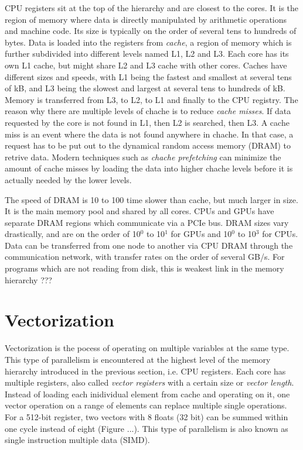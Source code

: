 CPU registers sit at the top of the hierarchy and are closest to the cores. It is the region of memory where data is directly manipulated by arithmetic operations and machine code. Its size is typically on the order of several tens to hundreds of bytes. Data is loaded into the registers from \emph{cache}, a region of memory which is further subdivided into different levels named L1, L2 and L3. Each core has its own L1 cache, but might share L2 and L3 cache with other cores. Caches have different sizes and speeds, with L1 being the fastest and smallest at several tens of kB, and L3 being the slowest and largest at several tens to hundreds of kB. Memory is transferred from L3, to L2, to L1 and finally to the CPU registry. The reason why there are multiple levels of chache is to reduce \emph{cache misses}. If data requested by the core is not found in L1, then L2 is searched, then L3. A cache miss is an event where the data is not found anywhere in chache. In that case, a request has to be put out to the dynamical random access memory (DRAM) to retrive data. Modern techniques such as \emph{chache prefetching} can minimize the amount of cache misses by loading the data into higher chache levels before it is actually needed by the lower levels. 

The speed of DRAM is 10 to 100 time slower than cache, but much larger in size. It is the main memory pool and shared by all cores. CPUs and GPUs have separate DRAM regions which communicate via a PCIe bus. DRAM sizes vary drastically, and are on the order of 10$^0$ to 10$^1$ for GPUs and 10$^0$ to 10$^3$ for CPUs. Data can be transferred from one node to another via CPU DRAM through the communication network, with transfer rates on the order of several GB/s. For programs which are not reading from disk, this is weakest link in the memory hierarchy ???

\section{Vectorization}

Vectorization is the pocess of operating on multiple variables at the same type. This type of parallelism is encountered at the highest level of the memory hierarchy introduced in the previous section, i.e. CPU registers. Each core has multiple registers, also called \emph{vector registers} with a certain size or \emph{vector length}. Instead of loading each inidividual element from cache and operating on it, one vector operation on a range of elements can replace multiple single operations. For a 512-bit register, two vectors with 8 floats (32 bit) can be summed within one cycle instead of eight (Figure ...). This type of parallelism is also known as single instruction multiple data (SIMD). 

